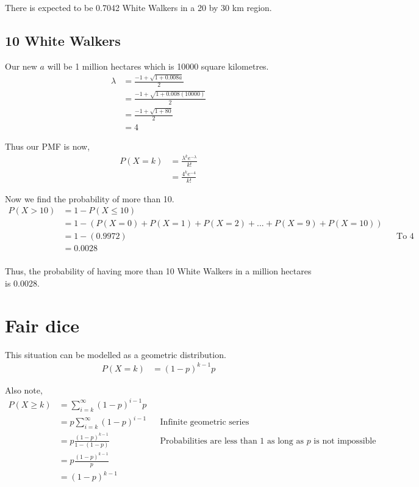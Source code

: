 \documentclass{article}
\begin{document}
There is expected to be 0.7042 White Walkers in a 20 by 30 km region.

\subsection{10 White Walkers}
Our new $a$ will be 1 million hectares which is 10000 square kilometres.
\begin{align*}
    \lambda &= \frac{-1 + \sqrt{1 + 0.008a}}{2} \\
    &= \frac{-1 + \sqrt{1 + 0.008(10000)}}{2} \\
    &= \frac{-1 + \sqrt{1 + 80}}{2} \\
    &= 4 
\end{align*}

Thus our PMF is now,
\begin{align*}
    P(X=k) &= \frac{\lambda^k e^{-\lambda}}{k!} \\
    &= \frac{4^k e^{-4}}{k!}
\end{align*}

Now we find the probability of more than 10.
\begin{align*}
    P(X>10) &= 1 - P(X\leq10) \\
    &= 1 - (P(X=0) + P(X=1) + P(X=2) + ... + P(X=9) + P(X=10)) \\
    &= 1 - (0.9972) && \text{To 4 decimal places} \\
    &= 0.0028 \\
\end{align*}

Thus, the probability of having more than 10 White Walkers in
a million hectares is 0.0028.

\section{Fair dice}
This situation can be modelled as a geometric distribution.
\begin{align*}
    P(X=k) &= (1-p)^{k-1}p
\end{align*}

Also note,
\begin{align*}
    P(X \geq k) &= \sum_{i=k}^\infty (1-p)^{i-1}p \\
    &= p \sum_{i=k}^\infty (1-p)^{i-1} && \text{Infinite geometric series} \\
    &= p \frac{(1-p)^{k-1}}{1-(1-p)}
    && \text{Probabilities are less than 1 as long as $p$ is not impossible} \\
    &= p \frac{(1-p)^{k-1}}{p} \\
    &= (1-p)^{k-1} \\
\end{align*}
\end{document}

